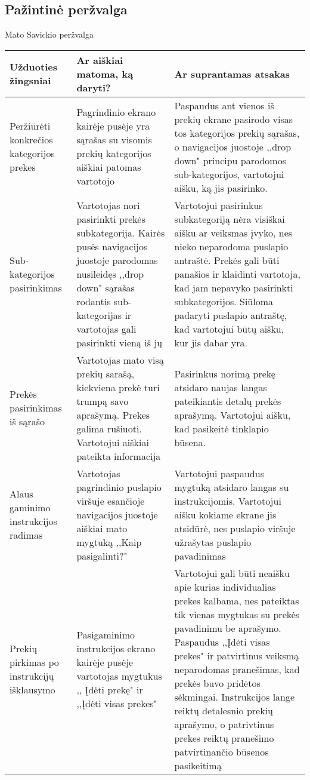 \documentclass[oneside]{VUMIFPSkursinis}
\begin{document}
	\subsection{Pažintinė peržvalga}
Mato Savickio peržvalga
\begin{center}
    \begin{tabular}{ |p{4cm}| p{6cm} | p{7cm} | }
    \hline
    	Užduoties žingsniai & Ar aiškiai matoma, ką daryti? & Ar suprantamas atsakas \\ \hline 
	Peržiūrėti konkrečios kategorijos prekes & Pagrindinio ekrano kairėje pusėje yra sąrašas su visomis prekių kategorijos aiškiai patomas vartotojo & Paspaudus ant vienos iš prekių ekrane pasirodo visas tos kategorijos prekių sąrašas, o navigacijos juostoje ,,drop down" principu parodomos sub-kategorijos, vartotojui aišku, ką jis pasirinko. \\ \hline
	Sub-kategorijos pasirinkimas & Vartotojas nori pasirinkti prekės subkategorija. Kairės pusės navigacijos juostoje parodomas nusileidęs ,,drop down" sąrašas rodantis sub-kategorijas ir vartotojas gali pasirinkti vieną iš jų & Vartotojui pasirinkus subkategoriją nėra visiškai aišku ar veiksmas įvyko, nes nieko neparodoma puslapio antraštė. Prekės gali būti panašios ir klaidinti vartotoja, kad jam nepavyko pasirinkti subkategorijos. Siūloma padaryti puslapio antraštę, kad vartotojui būtų aišku, kur jis dabar yra. \\ \hline
	Prekės pasirinkimas iš sąrašo & Vartotojas mato visą prekių sarašą, kiekviena prekė turi trumpą savo aprašymą. 
	Prekes galima rušiuoti. Vartotojui aiškiai pateikta informacija & Pasirinkus norimą prekę atsidaro naujas langas pateikiantis detalų prekės aprašymą. 
Vartotojui aišku, kad pasikeitė tinklapio būsena. \\ \hline
	Alaus gaminimo instrukcijos radimas & Vartotojas pagrindinio puslapio viršuje esančioje navigacijos juostoje aiškiai mato mygtuką ,,Kaip pasigalinti?" & Vartotojui paspaudus mygtuką atsidaro langas su instrukcijomis. Vartotojui aišku kokiame ekrane jis atsidūrė, nes puslapio viršuje užrašytas puslapio pavadinimas \\ \hline
	Prekių pirkimas po instrukcijų išklausymo & Pasigaminimo instrukcijos ekrano kairėje pusėje vartotojas mygtukus ,, Įdėti prekę" ir ,,Įdėti visas prekes" & Vartotojui gali būti neaišku apie kurias individualias prekes kalbama, nes pateiktas tik vienas mygtukas su prekės pavadinimu be aprašymo.
	Paspaudus ,,Įdėti visas prekes" ir patvirtinus veiksmą neparodomas pranešimas, kad prekės buvo pridėtos sėkmingai. Instrukcijos lange reiktų detalesnio prekių aprašymo, o patrivtinus prekes reiktų pranešimo patvirtinančio būsenos pasikeitimą \\ \hline
	
   \hline
    \end{tabular}
\end{center}
\end{document}
